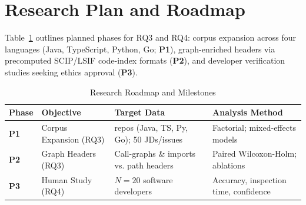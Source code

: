\section{Research Plan and Roadmap}
\label{sec:plan}

Table~\ref{tab:roadmap} outlines planned phases for RQ3 and RQ4: corpus expansion across four languages (Java, TypeScript, Python, Go; \textbf{P1}), graph-enriched headers via precomputed SCIP/LSIF code-index formats (\textbf{P2}), and developer verification studies seeking ethics approval (\textbf{P3}).

\begin{table}[t]
\caption{Research Roadmap and Milestones}
\label{tab:roadmap}
\centering\scriptsize
\setlength{\tabcolsep}{2pt}
\renewcommand{\arraystretch}{0.76}
\begin{threeparttable}
\begin{tabular}{@{}l>{\raggedright\arraybackslash}p{0.80in}>{\raggedright\arraybackslash}p{1.00in}>{\raggedright\arraybackslash}p{1.04in}@{}}
\toprule
Phase & Objective & Target Data & Analysis Method \\
\midrule
\textbf{P1} & Corpus Expansion (RQ3) & 100 repos (Java, TS, Py, Go); 50 JDs/issues & Factorial; mixed-effects models \\
\textbf{P2} & Graph Headers (RQ3) & Call-graphs \& imports vs. path headers & Paired Wilcoxon-Holm; ablations \\
\textbf{P3} & Human Study (RQ4) & $N=20$ software developers & Accuracy, inspection time, confidence \\
\bottomrule
\end{tabular}
\end{threeparttable}
\vspace{-6pt}
\end{table}
